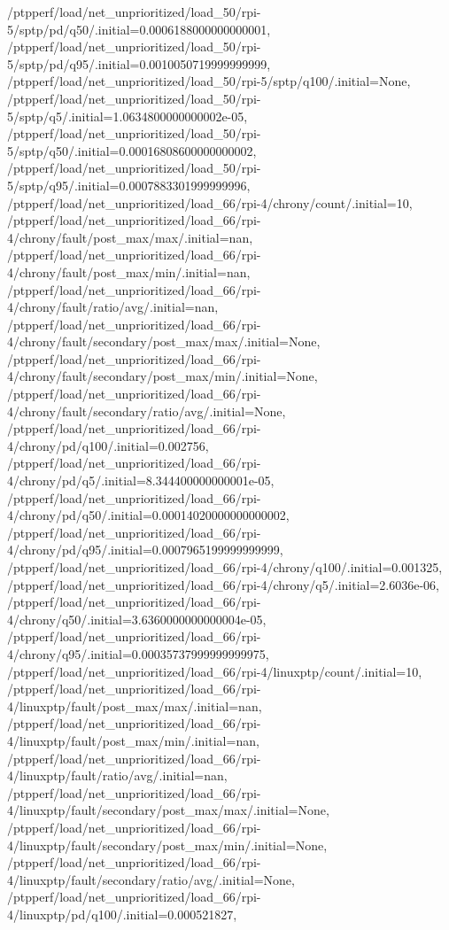 {    /ptpperf/load/net_unprioritized/load_50/rpi-5/sptp/pd/q50/.initial=0.0006188000000000001,
    /ptpperf/load/net_unprioritized/load_50/rpi-5/sptp/pd/q95/.initial=0.0010050719999999999,
    /ptpperf/load/net_unprioritized/load_50/rpi-5/sptp/q100/.initial=None,
    /ptpperf/load/net_unprioritized/load_50/rpi-5/sptp/q5/.initial=1.0634800000000002e-05,
    /ptpperf/load/net_unprioritized/load_50/rpi-5/sptp/q50/.initial=0.00016808600000000002,
    /ptpperf/load/net_unprioritized/load_50/rpi-5/sptp/q95/.initial=0.0007883301999999996,
    /ptpperf/load/net_unprioritized/load_66/rpi-4/chrony/count/.initial=10,
    /ptpperf/load/net_unprioritized/load_66/rpi-4/chrony/fault/post_max/max/.initial=nan,
    /ptpperf/load/net_unprioritized/load_66/rpi-4/chrony/fault/post_max/min/.initial=nan,
    /ptpperf/load/net_unprioritized/load_66/rpi-4/chrony/fault/ratio/avg/.initial=nan,
    /ptpperf/load/net_unprioritized/load_66/rpi-4/chrony/fault/secondary/post_max/max/.initial=None,
    /ptpperf/load/net_unprioritized/load_66/rpi-4/chrony/fault/secondary/post_max/min/.initial=None,
    /ptpperf/load/net_unprioritized/load_66/rpi-4/chrony/fault/secondary/ratio/avg/.initial=None,
    /ptpperf/load/net_unprioritized/load_66/rpi-4/chrony/pd/q100/.initial=0.002756,
    /ptpperf/load/net_unprioritized/load_66/rpi-4/chrony/pd/q5/.initial=8.344400000000001e-05,
    /ptpperf/load/net_unprioritized/load_66/rpi-4/chrony/pd/q50/.initial=0.00014020000000000002,
    /ptpperf/load/net_unprioritized/load_66/rpi-4/chrony/pd/q95/.initial=0.0007965199999999999,
    /ptpperf/load/net_unprioritized/load_66/rpi-4/chrony/q100/.initial=0.001325,
    /ptpperf/load/net_unprioritized/load_66/rpi-4/chrony/q5/.initial=2.6036e-06,
    /ptpperf/load/net_unprioritized/load_66/rpi-4/chrony/q50/.initial=3.6360000000000004e-05,
    /ptpperf/load/net_unprioritized/load_66/rpi-4/chrony/q95/.initial=0.00035737999999999975,
    /ptpperf/load/net_unprioritized/load_66/rpi-4/linuxptp/count/.initial=10,
    /ptpperf/load/net_unprioritized/load_66/rpi-4/linuxptp/fault/post_max/max/.initial=nan,
    /ptpperf/load/net_unprioritized/load_66/rpi-4/linuxptp/fault/post_max/min/.initial=nan,
    /ptpperf/load/net_unprioritized/load_66/rpi-4/linuxptp/fault/ratio/avg/.initial=nan,
    /ptpperf/load/net_unprioritized/load_66/rpi-4/linuxptp/fault/secondary/post_max/max/.initial=None,
    /ptpperf/load/net_unprioritized/load_66/rpi-4/linuxptp/fault/secondary/post_max/min/.initial=None,
    /ptpperf/load/net_unprioritized/load_66/rpi-4/linuxptp/fault/secondary/ratio/avg/.initial=None,
    /ptpperf/load/net_unprioritized/load_66/rpi-4/linuxptp/pd/q100/.initial=0.000521827,
}
